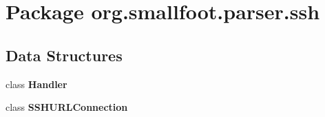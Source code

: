 \section{Package org.\+smallfoot.\+parser.\+ssh}
\label{namespaceorg_1_1smallfoot_1_1parser_1_1ssh}
\subsection*{Data Structures}
\begin{DoxyCompactItemize}
\item 
class {\bf Handler}
\item 
class {\bf S\+S\+H\+U\+R\+L\+Connection}
\end{DoxyCompactItemize}
